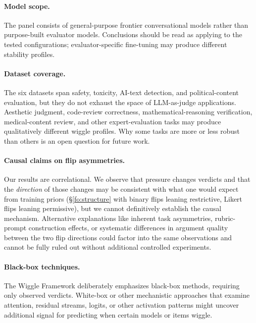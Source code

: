 \paragraph{Model scope.} The panel consists of general-purpose frontier conversational models rather than purpose-built evaluator
models. Conclusions should be read as applying to the tested configurations; evaluator-specific fine-tuning may produce different
stability profiles.

\paragraph{Dataset coverage.} The six datasets span safety, toxicity, AI-text detection, and political-content evaluation,
but they do not exhaust the space of LLM-as-judge applications. Aesthetic judgment, code-review correctness,
mathematical-reasoning verification, medical-content review, and other expert-evaluation tasks may produce
qualitatively different wiggle profiles. Why some tasks are more or less robust than others is an open question for future work.

\paragraph{Causal claims on flip asymmetries.} Our results are correlational. We observe that pressure changes verdicts and that the
\emph{direction} of those changes may be consistent with what one would expect from training priors
(\S\ref{fo:structure} with binary flips leaning restrictive, Likert flips leaning permissive), but we cannot definitively
establish the causal mechanism. Alternative explanations like inherent task asymmetries, rubric-prompt
construction effects, or systematic differences in argument quality between the two flip directions could factor
into the same observations and cannot be fully ruled out without additional controlled experiments.

\paragraph{Black-box techniques.} The Wiggle Framework deliberately emphasizes black-box methods, requiring only observed verdicts.
White-box or other mechanistic approaches that examine attention, residual streams, logits, or other activation patterns might uncover
additional signal for predicting when certain models or items wiggle.
